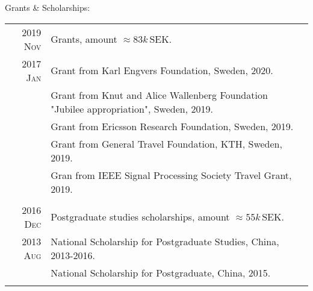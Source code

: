 \documentclass[a4paper,10pt]{article}
\begin{document}
{Grants \& Scholarships:}
\begin{savenotes}
  \begin{longtable}{r|p{13cm}}
    \textsc{2019 Nov} & Grants, amount $\approx 83k\,\mathrm{SEK}$.\\
    \textsc{2017 Jan}
                      & Grant from Karl Engvers Foundation, Sweden, 2020. \\

                      &  Grant from Knut and Alice Wallenberg Foundation
                        "Jubilee appropriation", Sweden, 2019. \\
                      & Grant from Ericsson Research Foundation, Sweden, 2019. \\
                      & Grant from General Travel Foundation, KTH, Sweden, 2019. \\
                      & Gran from IEEE Signal Processing Society Travel Grant, 2019. \\
    \multicolumn{2}{c}{} \\
    \textsc{2016 Dec} & Postgraduate studies scholarships, amount $\approx 55k\,\mathrm {SEK}$. \\
    \textsc{2013 Aug}
                      & National Scholarship for Postgraduate Studies, China, 2013-2016. \\
                      & National Scholarship for Postgraduate, China, 2015.\\
    \multicolumn{2}{c}{} \\


\end{longtable}
\end{savenotes}
\end{document}
